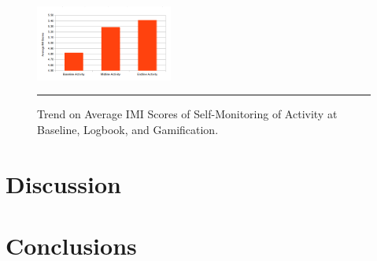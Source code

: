 \documentclass{sig-alternate}
\begin{document}
\begin{figure}[htbp]
  \centering
    \includegraphics[width=0.4\textwidth]{imi_activity.png}
    \rule{26em}{0.5pt}
  \caption{Trend on Average IMI Scores of Self-Monitoring of Activity at Baseline, Logbook, and Gamification.}
  \label{figure:imi_activity}
\end{figure}\newline
\section{Discussion}
\section{Conclusions}



%

%
%
\end{document}
